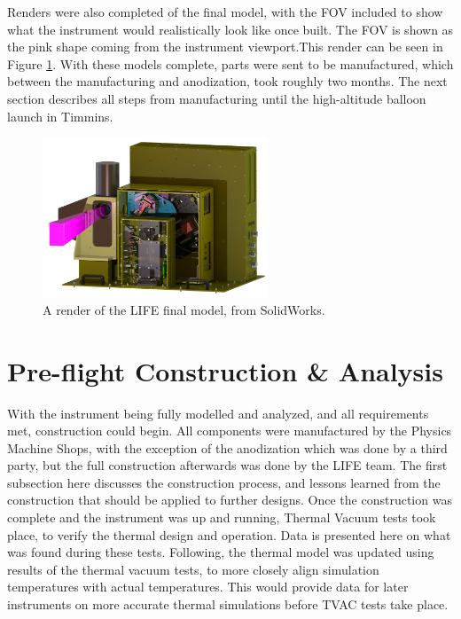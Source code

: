 Renders were also completed of the final model, with the FOV included to show what the instrument would realistically look like once built. The FOV is shown as the pink shape coming from the instrument viewport.This render can be seen in Figure \ref{fig:LIFE_FINAL_RENDER}. With these models complete, parts were sent to be manufactured, which between the manufacturing and anodization, took roughly two months. The next section describes all steps from manufacturing until the high-altitude balloon launch in Timmins.

\begin{figure}
    \centering
    \includegraphics[width=0.6\textwidth]{chap3_images/LIFE_V5_final_images/side_view_bbebox.png}
    \caption{A render of the LIFE final model, from SolidWorks.}
    \label{fig:LIFE_FINAL_RENDER}
\end{figure}

\section{Pre-flight Construction \& Analysis}\label{preflight_const_analysis}
With the instrument being fully modelled and analyzed, and all requirements met, construction could begin. All components were manufactured by the Physics Machine Shops, with the exception of the anodization which was done by a third party, but the full construction afterwards was done by the LIFE team. The first subsection here discusses the construction process, and lessons learned from the construction that should be applied to further designs. Once the construction was complete and the instrument was up and running, Thermal Vacuum tests took place, to verify the thermal design and operation. Data is presented here on what was found during these tests. Following, the thermal model was updated using results of the thermal vacuum tests, to more closely align simulation temperatures with actual temperatures. This would provide data for later instruments on more accurate thermal simulations before TVAC tests take place. 

